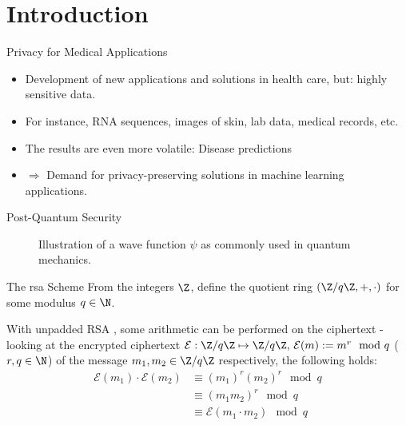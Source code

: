 \section{Introduction}
\begin{frame}{Privacy for Medical Applications}
  \begin{itemize}
    \item Development of new applications and solutions in health care, but: highly sensitive data.
    \item For instance, RNA sequences, images of skin, lab data, medical records, etc.
    \item The results are even more volatile: Disease predictions
    \item $\Rightarrow$ Demand for privacy-preserving solutions in machine learning applications.
  \end{itemize}
\end{frame}

\begin{frame}{Post-Quantum Security}
  \begin{figure}[H]
    \centering
    \caption{Illustration of a wave function $\psi$ as commonly used in quantum mechanics.}
    \label{fig:wave-function}
  \end{figure}
\end{frame}

\begin{frame}{The \gls{rsa} Scheme}
  From the integers $\Z$, define the quotient ring $(\Z/q\Z, +, \cdot)$ for some modulus $q \in \N$.

  With unpadded RSA \parencite{1983-rsa}, some arithmetic can be performed on the ciphertext - looking at the encrypted ciphertext $\mathcal{E}: \Z/q\Z \mapsto \Z/q\Z,\, \mathcal{E}(m) := m^r \mod q$ ($r, q \in \N$) of the message $m_1, m_2 \in \Z/q\Z$ respectively, the following holds:
  \begin{align*}
    \mathcal{E}(m_1) \cdot \mathcal{E}(m_2)
     & \equiv (m_1)^r (m_2)^r \mod q            \\
     & \equiv (m_1 m_2)^r \mod q                \\
     & \equiv \mathcal{E}(m_1 \cdot m_2) \mod q
  \end{align*}
\end{frame}
